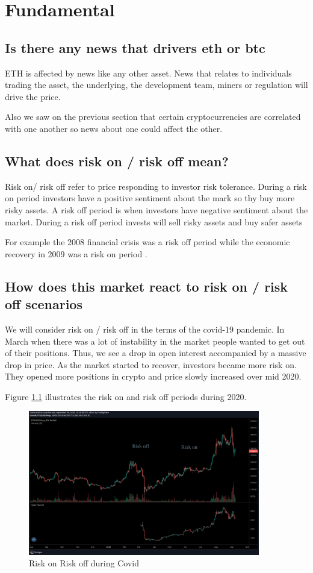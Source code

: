 \chapter{Fundamental}
\label{fun}

\section{ Is there any news that drivers eth or btc}
ETH is affected by news like any other asset. News that relates to individuals trading the asset, the underlying, the development team, miners or regulation will drive the price.


Also we saw on the previous section that certain cryptocurrencies are correlated with one another so news about one could affect the other.
  
\section{ What does risk on / risk off mean?}
Risk on/ risk off refer to price responding to investor risk tolerance. During a risk on period investors have a positive sentiment about the mark so thy buy more risky assets. A risk off period is when investors have negative sentiment about the market.  During a risk off period invests will sell risky assets and buy safer assets

For example the 2008  financial crisis was a risk off period while the economic recovery in 2009 was a risk on period \cite{rri}.

\section{ How does this market react to risk on / risk off scenarios}
We will consider risk on / risk off in the terms of the covid-19 pandemic. In March when there was a lot of instability in the market people wanted to get out of their positions. Thus, we see a drop in open interest  accompanied by a massive drop in price. As the market started to recover,  investors became more risk on.  They opened more positions in crypto and price slowly increased over mid 2020. 

Figure \ref{fig:rr} illustrates the risk on and risk off periods during 2020.


\begin{figure}[H]
\center
\includegraphics[width=0.9\textwidth]{fig/rr.png}
\caption{Risk on Risk off during Covid}
\label{fig:rr}
\end{figure}

